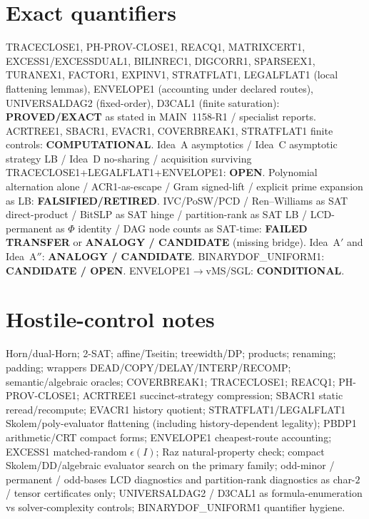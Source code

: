 \documentclass[11pt]{article}
\begin{document}
\section*{Exact quantifiers}
TRACECLOSE1, PH-PROV-CLOSE1, REACQ1, MATRIXCERT1, EXCESS1/EXCESSDUAL1, BILINREC1, DIGCORR1,
SPARSEEX1, TURANEX1, FACTOR1, EXPINV1, STRATFLAT1, LEGALFLAT1 (local flattening lemmas),
ENVELOPE1 (accounting under declared routes), UNIVERSALDAG2 (fixed-order), D3CAL1 (finite
saturation): \textbf{PROVED/EXACT} as stated in MAIN~1158-R1 / specialist reports.
ACRTREE1, SBACR1, EVACR1, COVERBREAK1, STRATFLAT1 finite controls: \textbf{COMPUTATIONAL}.
Idea~A asymptotics / Idea~C asymptotic strategy LB / Idea~D no-sharing / acquisition surviving
TRACECLOSE1+LEGALFLAT1+ENVELOPE1: \textbf{OPEN}.
Polynomial alternation alone / ACR1-as-escape / Gram signed-lift / explicit prime expansion as LB:
\textbf{FALSIFIED/RETIRED}.
IVC/PoSW/PCD / Ren--Williams as SAT direct-product / BitSLP as SAT hinge / partition-rank as
SAT LB / LCD-permanent as $\Phi$ identity / DAG node counts as SAT-time:
\textbf{FAILED TRANSFER} or \textbf{ANALOGY / CANDIDATE} (missing bridge).
Idea~A$'$ and Idea~A$''$: \textbf{ANALOGY / CANDIDATE}.
BINARYDOF\_UNIFORM1: \textbf{CANDIDATE / OPEN}.
ENVELOPE1$\to$vMS/SGL: \textbf{CONDITIONAL}.

\section*{Hostile-control notes}
Horn/dual-Horn; 2-SAT; affine/Tseitin; treewidth/DP; products; renaming; padding;
wrappers DEAD/COPY/DELAY/INTERP/RECOMP; semantic/algebraic oracles; COVERBREAK1;
TRACECLOSE1; REACQ1; PH-PROV-CLOSE1; ACRTREE1 succinct-strategy compression; SBACR1
static reread/recompute; EVACR1 history quotient; STRATFLAT1/LEGALFLAT1 Skolem/poly-evaluator
flattening (including history-dependent legality); PBDP1 arithmetic/CRT compact forms;
ENVELOPE1 cheapest-route accounting; EXCESS1 matched-random $\epsilon(I)$; Raz natural-property
check; compact Skolem/DD/algebraic evaluator search on the primary family; odd-minor /
permanent / odd-bases LCD diagnostics and partition-rank diagnostics as char-$2$ / tensor
certificates only; UNIVERSALDAG2 / D3CAL1 as formula-enumeration vs solver-complexity
controls; BINARYDOF\_UNIFORM1 quantifier hygiene.
\end{document}
